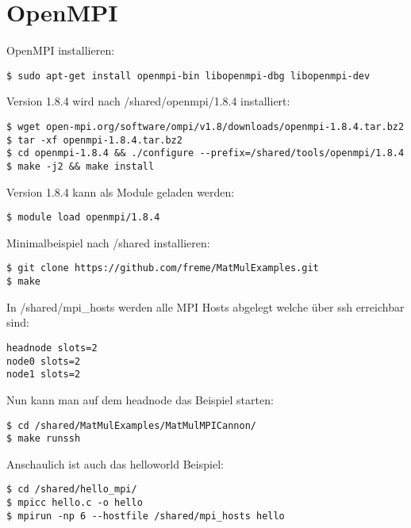 \chapter{OpenMPI}
OpenMPI installieren:
\begin{lstlisting}[style=Bash]
$ sudo apt-get install openmpi-bin libopenmpi-dbg libopenmpi-dev
\end{lstlisting}
Version 1.8.4 wird nach /shared/openmpi/1.8.4 installiert:
\begin{lstlisting}[style=Bash]
$ wget open-mpi.org/software/ompi/v1.8/downloads/openmpi-1.8.4.tar.bz2
$ tar -xf openmpi-1.8.4.tar.bz2
$ cd openmpi-1.8.4 && ./configure --prefix=/shared/tools/openmpi/1.8.4
$ make -j2 && make install
\end{lstlisting}
Version 1.8.4 kann als Module geladen werden:
\begin{lstlisting}[style=Bash]
$ module load openmpi/1.8.4
\end{lstlisting}
Minimalbeispiel nach /shared installieren:
\begin{lstlisting}[style=Bash]
$ git clone https://github.com/freme/MatMulExamples.git
$ make
\end{lstlisting}
In /shared/mpi\_hosts werden alle MPI Hosts abgelegt welche über ssh erreichbar sind:
\begin{lstlisting}[style=Bash]
headnode slots=2
node0 slots=2
node1 slots=2
\end{lstlisting}
Nun kann man auf dem headnode das Beispiel starten:
\begin{lstlisting}[style=Bash]
$ cd /shared/MatMulExamples/MatMulMPICannon/
$ make runssh
\end{lstlisting}
Anschaulich ist auch das helloworld Beispiel:
\begin{lstlisting}[style=Bash]
$ cd /shared/hello_mpi/
$ mpicc hello.c -o hello 
$ mpirun -np 6 --hostfile /shared/mpi_hosts hello
\end{lstlisting}
